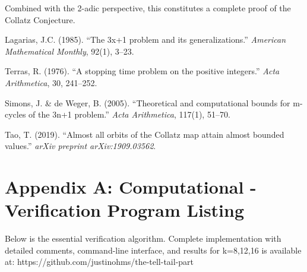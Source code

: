 \documentclass[10pt,letterpaper]{article}
\begin{document}
Combined with the 2-adic perspective, this constitutes a complete proof of the Collatz Conjecture.


\newpage



\begin{thebibliography}{9}
Lagarias, J.C. (1985). ``The 3x+1 problem and its generalizations.'' \emph{American Mathematical Monthly}, 92(1), 3--23.

Terras, R. (1976). ``A stopping time problem on the positive integers.'' \emph{Acta Arithmetica}, 30, 241--252.

Simons, J. \& de Weger, B. (2005). ``Theoretical and computational bounds for m-cycles of the 3n+1 problem.'' \emph{Acta Arithmetica}, 117(1), 51--70.

Tao, T. (2019). ``Almost all orbits of the Collatz map attain almost bounded values.'' \emph{arXiv preprint arXiv:1909.03562}.
\end{thebibliography}



\newpage
\section*{Appendix A: Computational - Verification Program Listing}

Below is the essential verification algorithm. Complete implementation with detailed comments, command-line interface, and results for k=8,12,16 
is available at: https://github.com/justinohms/the-tell-tail-part
\end{document}
